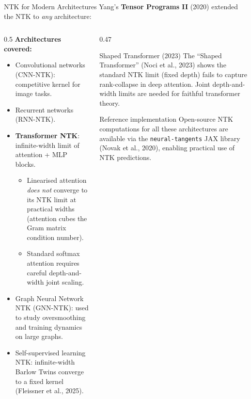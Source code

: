 \documentclass[aspectratio=169, 10pt]{beamer}
\begin{document}
\begin{frame}{NTK for Modern Architectures}
  Yang's \textbf{Tensor Programs II} (2020) extended the NTK to \emph{any} architecture:

  \vspace{0.3em}
  \begin{columns}[T]
    \begin{column}{0.5\textwidth}
      \textbf{Architectures covered:}
      \begin{itemize}
        \item Convolutional networks (CNN-NTK): competitive kernel for image tasks.
        \item Recurrent networks (RNN-NTK).
        \item \textbf{Transformer NTK}: infinite-width limit of attention + MLP blocks.
          \begin{itemize}
            \item Linearised attention \emph{does not} converge to its NTK limit at practical widths (attention cubes the Gram matrix condition number).
            \item Standard softmax attention requires careful depth-and-width joint scaling.
          \end{itemize}
        \item Graph Neural Network NTK (GNN-NTK): used to study oversmoothing and training dynamics on large graphs.
        \item Self-supervised learning NTK: infinite-width Barlow Twins converge to a fixed kernel (Fleissner et al., 2025).
      \end{itemize}
    \end{column}
    \begin{column}{0.47\textwidth}
      \begin{block}{Shaped Transformer (2023)}
        The ``Shaped Transformer'' (Noci et al., 2023) shows the standard NTK limit (fixed depth) fails to capture rank-collapse in deep attention. Joint depth-and-width limits are needed for faithful transformer theory.
      \end{block}
      \vspace{0.4em}
      \begin{exampleblock}{Reference implementation}
        Open-source NTK computations for all these architectures are available via the \texttt{neural-tangents} JAX library (Novak et al., 2020), enabling practical use of NTK predictions.
      \end{exampleblock}
    \end{column}
  \end{columns}
\end{frame}
\end{document}
